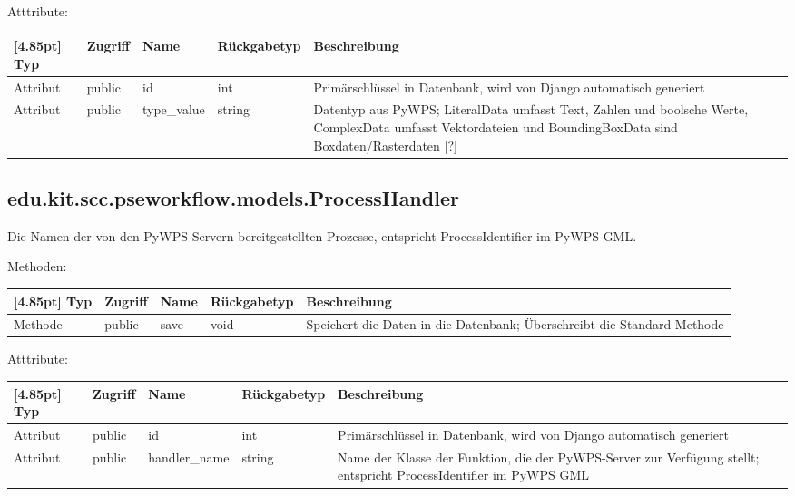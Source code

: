 			Atttribute:
			\begin{center}
				\setlength\tabcolsep{5pt}
				\renewcommand{\arraystretch}{1.5}
				
				\begin{tabularx}{\textwidth}{|l|l|l|l|X|}
					\hline
					\rowcolor[gray]{0.75}[4.85pt]
					Typ & Zugriff & Name & Rückgabetyp & Beschreibung \\ \hline 
					Attribut & public & id & int & Primärschlüssel in Datenbank, wird von Django automatisch generiert \\ \hline
					Attribut & public & type\_value & string & Datentyp aus PyWPS; LiteralData umfasst Text, Zahlen und boolsche Werte, ComplexData umfasst Vektordateien und BoundingBoxData sind Boxdaten/Rasterdaten [?] \\
					\hline
				\end{tabularx}
			\end{center}
		
		\subsection{edu.kit.scc.pseworkflow.models.ProcessHandler}
			Die Namen der von den PyWPS-Servern bereitgestellten Prozesse, entspricht ProcessIdentifier im PyWPS GML.
			
			Methoden:
			\begin{center}
				\setlength\tabcolsep{5pt}
				\renewcommand{\arraystretch}{1.5}
				
				\begin{tabularx}{\textwidth}{|l|l|l|l|X|}
					\hline
					\rowcolor[gray]{0.75}[4.85pt]
					Typ & Zugriff & Name & Rückgabetyp & Beschreibung \\ \hline 
					Methode & public & save & void & Speichert die Daten in die Datenbank; Überschreibt die Standard Methode \\ 
					\hline
				\end{tabularx}
			\end{center}
			
			Atttribute:
			\begin{center}
				\setlength\tabcolsep{5pt}
				\renewcommand{\arraystretch}{1.5}
				
				\begin{tabularx}{\textwidth}{|l|l|l|l|X|}
					\hline
					\rowcolor[gray]{0.75}[4.85pt]
					Typ & Zugriff & Name & Rückgabetyp & Beschreibung \\ \hline 
					Attribut & public & id & int & Primärschlüssel in Datenbank, wird von Django automatisch generiert \\ \hline
					Attribut & public & handler\_name & string & Name der Klasse der Funktion, die der PyWPS-Server zur Verfügung stellt; entspricht ProcessIdentifier im PyWPS GML \\
					\hline
				\end{tabularx}
			\end{center}
		\par
		
